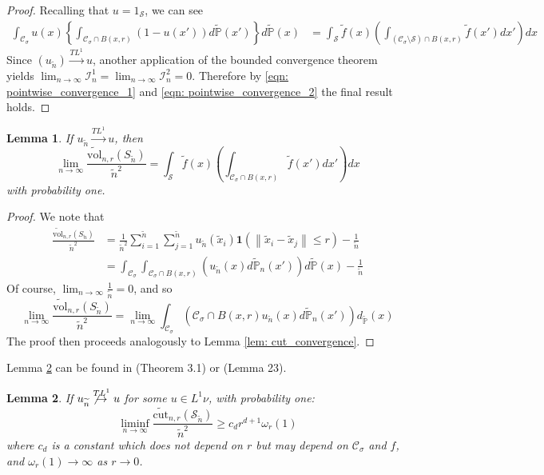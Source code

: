 \documentclass{article}
\newcommand{\vol}{\mathrm{vol}}
\newcommand{\norm}[1]{\left\lVert#1\right\rVert}
\newcommand{\1}{\mathbf{1}}
\newcommand{\cut}{\mathrm{cut}}
\newcommand{\Pbb}{\mathbb{P}}
\newcommand{\Sset}{\mathcal{S}}
\newcommand{\Cset}{\mathcal{C}}
\newcommand{\Csig}{\Cset_{\sigma}}
\newcommand{\wn}{\widetilde{n}}
\newcommand{\wx}{\widetilde{x}}
\newcommand{\wPbb}{\widetilde{\Pbb}}
\newcommand{\wf}{\widetilde{f}}
\theoremstyle{aldenthm}
\newtheorem{lemma}{Lemma}
\begin{document}
\begin{proof}
	Recalling that $u = 1_{\Sset}$, we can see
	\begin{align}
	\label{eqn: pointwise_convergence_2}
	\int_{\Csig} u(x) \left\{ \int_{\Csig \cap B(x,r)} (1 - u(x')) d\wPbb(x') \right\} d\wPbb(x) & = \int_{\Sset} \wf(x) \left(\int_{(\Csig \setminus \Sset) \cap B(x,r)} \wf(x') dx' \right) dx
	\end{align}
	Since $(u_{\wn}) \overset{TL^1}{\to} u$, another application of the bounded convergence theorem yields $\lim_{n \to \infty} \mathcal{I}_n^1 = \lim_{n \to \infty} \mathcal{I}_n^2 = 0$. Therefore by \eqref{eqn: pointwise_convergence_1} and \eqref{eqn: pointwise_convergence_2} the final result holds.
\end{proof}

\begin{lemma}
	\label{lem: vol_convergence}
	If $u_{\wn} \overset{TL^1}{\to} u$, then
	\begin{equation*}
	\lim_{n \to \infty} \frac{\widetilde{\vol}_{n,r}(S_{\wn})}{\wn^2} = 
	\int_{\Sset} \wf(x) \left(\int_{\Csig \cap B(x,r)} \wf(x') dx' \right) dx
	\end{equation*}
	with probability one. 
\end{lemma}
\begin{proof}
	We note that
	\begin{align*}
	\frac{\widetilde{\vol}_{n,r}(S_{\wn})}{\wn^2} & = \frac{1}{\widetilde{n}^2} \sum_{i = 1}^{\wn} \sum_{j = 1}^{\wn} u_{\wn}(\wx_i) \1(\norm{\wx_i - \wx_j} \leq r) - \frac{1}{\widetilde{n}} \\
	& = \int_{\Csig} \int_{\Csig \cap B(x,r)} \left(u_{\wn}(x) d\wPbb_n(x')\right) d{\wPbb}(x) - \frac{1}{\wn}
	\end{align*}
	Of course, $\lim_{n \to \infty}  \frac{1}{\wn} = 0$, and so
	\begin{equation*}
	\lim_{n \to \infty} \frac{\widetilde{\vol}_{n,r}(S_{\wn})}{\wn^2} = \lim_{n \to \infty} \int_{\Csig} \left(\Csig \cap B(x,r) u_{\wn}(x) d\wPbb_n(x')\right) d_{\wPbb}(x)
	\end{equation*}
	The proof then proceeds analogously to Lemma \ref{lem: cut_convergence}. 
\end{proof}

Lemma \ref{lem: pre-compactness} can be found in \cite{alberti1998non} (Theorem 3.1) or \cite{garciatrillos16} (Lemma 23).
\begin{lemma}
	\label{lem: pre-compactness}
	If $u_{\wn} \not\overset{TL^1}{\to} u$ for some $u \in L^1{\nu}$, with probability one:
	\begin{equation*}
	\liminf_{n \to \infty} \frac{\widetilde{\cut}_{n,r}(\Sset_{\wn})}{\wn^2 } \geq  c_d r^{d+1} \omega_r(1)
	\end{equation*}
	where $c_d$ is a constant which does not depend on $r$ but may depend on $\Csig$ and $f$, and $\omega_r(1) \to \infty$ as $r \to 0$. 
\end{lemma}
\end{document}
